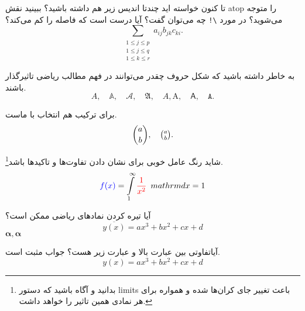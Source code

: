 \begin{description}
\iq
تا کنون خواسته اید چندتا اندیس زیر هم داشته باشید؟
\ia
ببینید نقش atop را متوجه می‌شوید؟ در مورد \verb|\!| چه می‌توان گفت؟ آیا درست است که فاصله را کم می‌کند؟
\begin{equation}\label{eq:atop}
\sum_{\substack{1\le j\le p\\ %
1\le j\le q\\ 1\le k\le r%
}}\!\!\! a_{ij}b_{jk}c_{ki}.
\end{equation}
\end{description}

\begin{remark}
به خاطر داشته باشید که شکل حروف چقدر می‌توانند در فهم مطالب ریاضی تاثیرگذار باشند.
\[
A,\quad \mathbb{A},\quad \mathcal{A},\quad\mathfrak{A},\quad\mathit{A},\mathrm{A},\quad\mathsf{A},\quad\mathtt{A}.
\]
\end{remark}

\begin{rem}
برای ترکیب هم انتخاب با ماست.
\[
\binom{a}{b},\quad \tbinom{a}{b}.
\]
\end{rem}
\begin{hint}
شاید رنگ عامل خوبی برای نشان دادن تفاوت‌ها و تاکیدها باشد\footnote[2]{بدانید و آگاه باشید که دستور limits باعث تغییر جای کران‌ها شده و همواره برای هر نمادی همین تاثیر را خواهد داشت.}. 
\begin{equation}
\textcolor{blue}{f(x)} = \int\limits_1^{\infty}\textcolor{red}{\frac{1}{x^2}}\,\
mathrm{d}x=1
\end{equation}
\end{hint}
\begin{problem}
آیا تیره کردن نمادهای ریاضی ممکن است؟
{%
\begin{equation*}
\overline{y(x)} = ax^3+bx^2+cx+d
\end{equation*}}
$\pmb{\alpha},\boldsymbol{\alpha}$
\end{problem}
\begin{solution}
آیاتفاوتی بین عبارت بالا و عبارت زیر هست؟ جواب مثبت است.
\begin{equation*}
y(x) = ax^3+bx^2+cx+d
\end{equation*}
\end{solution}


